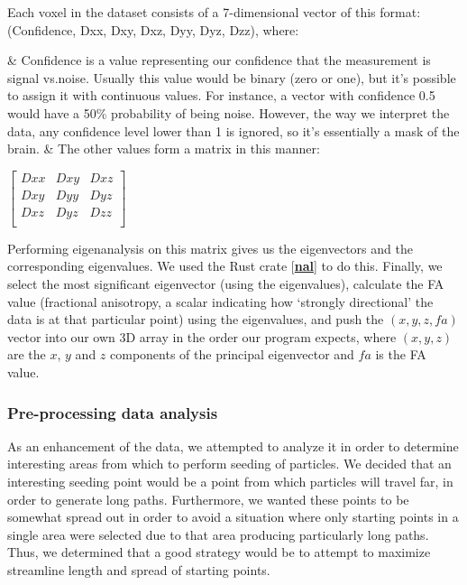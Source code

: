 \documentclass{article}
\newcommand{\code}[1]{\fcolorbox{codebd}{codebg}{\lstinline[basicstyle=\ttfamily\color{codefg}]{#1}}}
\newcommand{\reference}[1]{[\hyperref[ref:#1]{\textbf{#1}}]}
\begin{document}
Each voxel in the dataset consists of a 7-dimensional vector of this format: (Confidence, Dxx, Dxy, Dxz, Dyy, Dyz, Dzz), where:
\begin{easylist}[itemize]
& Confidence is a value representing our confidence that the measurement is signal vs.\@ noise. Usually this value would be binary (zero or one), but it's possible to assign it with continuous values. For instance, a vector with confidence 0.5 would have a 50\% probability of being noise. However, the way we interpret the data, any confidence level lower than 1 is ignored, so it's essentially a mask of the brain.
& The other values form a matrix in this manner:
\end{easylist}

\hspace{1cm}
\(\begin{bmatrix}
    Dxx & Dxy & Dxz \\
    Dxy & Dyy & Dyz \\
    Dxz & Dyz & Dzz \\
\end{bmatrix}\)

Performing eigenanalysis on this matrix gives us the eigenvectors and the corresponding eigenvalues. We used the Rust crate \code{nalgebra} \reference{nal} to do this. Finally, we select the most significant eigenvector (using the eigenvalues), calculate the FA value (fractional anisotropy, a scalar indicating how `strongly directional' the data is at that particular point) using the eigenvalues, and push the \((x, y, z, fa)\) vector into our own 3D array in the order our program expects, where \((x, y, z)\) are the \(x\), \(y\) and \(z\) components of the principal eigenvector and \(fa\) is the FA value.

\subsubsection*{Pre-processing data analysis}\label{sec:prepro}

As an enhancement of the data, we attempted to analyze it in order to determine interesting areas from which to perform seeding of particles. We decided that an interesting seeding point would be a point from which particles will travel far, in order to generate long paths. Furthermore, we wanted these points to be somewhat spread out in order to avoid a situation where only starting points in a single area were selected due to that area producing particularly long paths. Thus, we determined that a good strategy would be to attempt to maximize streamline length and spread of starting points.
\end{document}
